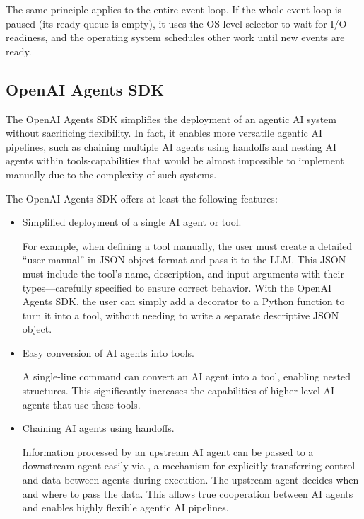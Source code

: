 The same principle applies to the entire event loop. If the whole event loop is paused (its ready queue is empty), it uses the OS-level selector to wait for I/O readiness, and the operating system schedules other work until new events are ready.

\subsection{OpenAI Agents SDK} \label{sec:openaisgentssdk}

The OpenAI Agents SDK simplifies the deployment of an agentic AI system without sacrificing flexibility. In fact, it enables more versatile agentic AI pipelines, such as chaining multiple AI agents using handoffs and nesting AI agents within tools-capabilities that would be almost impossible to implement manually due to the complexity of such systems.

The OpenAI Agents SDK offers at least the following features:
\begin{itemize}
	\item Simplified deployment of a single AI agent or tool.
	
	For example, when defining a tool manually, the user must create a detailed “user manual” in JSON object format and pass it to the LLM. This JSON must include the tool’s name, description, and input arguments with their types—carefully specified to ensure correct behavior. With the OpenAI Agents SDK, the user can simply add a decorator to a Python function to turn it into a tool, without needing to write a separate descriptive JSON object.
	
	\item Easy conversion of AI agents into tools.
	
	A single-line command can convert an AI agent into a tool, enabling nested structures. This significantly increases the capabilities of higher-level AI agents that use these tools.
	
	\item Chaining AI agents using handoffs. 
	
	Information processed by an upstream AI agent can be passed to a downstream agent easily via , a mechanism for explicitly transferring control and data between agents during execution. The upstream agent decides when and where to pass the data. This allows true cooperation between AI agents and enables highly flexible agentic AI pipelines.
\end{itemize}

